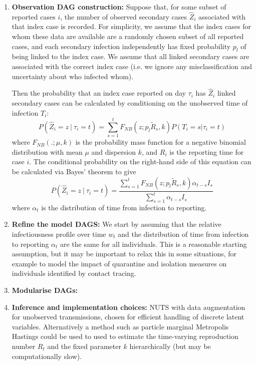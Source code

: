 \documentclass{article}
\begin{document}
\begin{enumerate}
\begin{enumerate}
    \item \textbf{Observation DAG construction:} Suppose that, for some subset of reported cases $i$, the number of observed secondary cases $\hat{Z}_i$ associated with that index case is recorded. For simplicity, we assume that the index cases for whom these data are available are a randomly chosen subset of all reported cases, and each secondary infection independently has fixed probability $p_l$ of being linked to the index case. We assume that all linked secondary cases are associated with the correct index case (i.e. we ignore any misclassification and uncertainty about who infected whom). 

   Then the probability that an index case reported on day $\tau_i$ has $\hat{Z}_i$ linked secondary cases can be calculated by conditioning on the unobserved time of infection $T_i$:
   \begin{equation}
       P(\hat{Z}_i=z \ | \ \tau_i=t) = \sum_{s=1}^{t} F_{NB}(z; p_l\tilde{R}_s,k) P(T_i=s | \tau_i=t)
   \end{equation}
where $F_{NB}(.;\mu,k)$ is the probability mass function for a negative binomial distribution with mean $\mu$ and dispersion $k$, and $R_i$ is the reporting time for case $i$.  The conditional probability on the right-hand side of this equation can be calculated via Bayes' theorem to give
   \begin{equation} \label{eq:Zhat}
       P(\hat{Z}_i=z \ | \ \tau_i=t) = \frac{\sum_{s=1}^{t} F_{NB}(z; p_l\tilde{R}_s,k) \alpha_{t-s} I_s}{\sum_{s=1}^{t}\alpha_{t-s} I_s}  
   \end{equation}
 where $\alpha_t$ is the distribution of time from infection to reporting.

    \item \textbf{Refine the model DAGS:}  We start by assuming that the relative infectiousness profile over time $w_t$ and the distribution of time from infection to reporting $\alpha_t$ are the same for all individuals. This is a reasonable starting assumption, but it may be important to relax this in some situations, for example to model the impact of quarantine and isolation measures on individuals identified by contact tracing.

    \item \textbf{Modularise DAGs:} 
    
    \item \textbf{Inference and implementation choices:} NUTS with data augmentation for unobserved transmissions, chosen for efficient handling of discrete latent variables. Alternatively a method such as particle marginal Metropolis Hastings could be used to used to estimate the time-varying reproduction number $R_t$ and the fixed parameter $k$ hierarchically (but may be computationally slow). 


\end{enumerate}
\end{enumerate}
\end{document}

